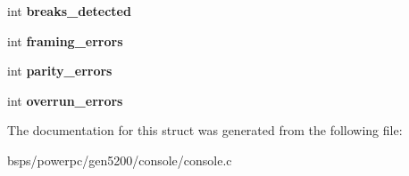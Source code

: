 \begin{DoxyCompactItemize}
int {\bfseries breaks\+\_\+detected}
\item 
\mbox{\label{structper__channel__info_a3d8bd6f3b815b88e98150f6ff8a6e6b5}} 
int {\bfseries framing\+\_\+errors}
\item 
\mbox{\label{structper__channel__info_a4fb6d62996dfebb4e2667c3b31d7c45a}} 
int {\bfseries parity\+\_\+errors}
\item 
\mbox{\label{structper__channel__info_ab0f5343d650bf22d28dfdc5d091711f1}} 
int {\bfseries overrun\+\_\+errors}
\end{DoxyCompactItemize}


The documentation for this struct was generated from the following file\+:\begin{DoxyCompactItemize}
\item 
bsps/powerpc/gen5200/console/console.\+c\end{DoxyCompactItemize}
